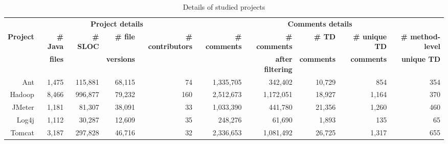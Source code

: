 \begin{table*}[tb]
  \caption{Details of studied projects}
  \label{tab:projects}
  \centering

  \begin{tabular}{r|rrrr|rrrrr}
  \hline
\textbf{} & \multicolumn{4}{c|}{\textbf{Project details}} & \multicolumn{5}{c}{\textbf{Comments details}} \\ \cline{2-10}
\textbf{Project} & \textbf{\# Java} & \textbf{\# SLOC} & \textbf{\# file} & \textbf{\# contributors} & \textbf{\# comments} & \textbf{\# comments} & \textbf{\# TD} & \textbf{\# unique TD} & \textbf{\# method-level} \\
\textbf{} & \textbf{files} & & \textbf{versions} & & & \textbf{after filtering} & \textbf{ comments} & \textbf{comments}& \textbf{unique TD} \\
  \hline
Ant        &1,475 & 115,881 & 68,115 & 74 & 1,335,705 & 342,402 & 10,729 &  854 & 354 \\
Hadoop     &8,466 & 996,877 & 79,232 &160 & 2,512,673 & 1,172,051 & 18,927 & 1,164 & 370 \\
JMeter     &1,181 & 81,307  & 38,091 & 33 & 1,033,390 & 441,780 & 21,356 & 1,260 & 460 \\
Log4j      &1,112 & 30,287  & 12,609 & 35 &   248,276 &  61,690 &  1,893 & 135 & 65 \\
Tomcat     &3,187 & 297,828 & 46,716 & 32 & 2,336,653 & 1,081,492 & 26,725 & 1,317 & 655 \\
  \hline
  \end{tabular}
\end{table*}
